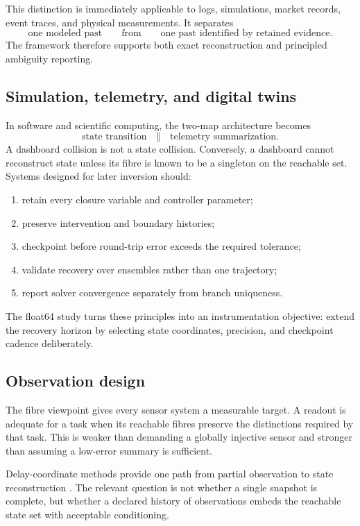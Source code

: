 This distinction is immediately applicable to logs, simulations, market records, event traces, and physical measurements. It separates
\[
\text{one modeled past}
\qquad\text{from}\qquad
\text{one past identified by retained evidence}.
\]
The framework therefore supports both exact reconstruction and principled ambiguity reporting.

\subsection{Simulation, telemetry, and digital twins}

In software and scientific computing, the two-map architecture becomes
\[
\text{state transition}
\quad\Vert\quad
\text{telemetry summarization}.
\]
A dashboard collision is not a state collision. Conversely, a dashboard cannot reconstruct state unless its fibre is known to be a singleton on the reachable set. Systems designed for later inversion should:
\begin{enumerate}
\item retain every closure variable and controller parameter;
\item preserve intervention and boundary histories;
\item checkpoint before round-trip error exceeds the required tolerance;
\item validate recovery over ensembles rather than one trajectory;
\item report solver convergence separately from branch uniqueness.
\end{enumerate}

The float64 study turns these principles into an instrumentation objective: extend the recovery horizon by selecting state coordinates, precision, and checkpoint cadence deliberately.

\subsection{Observation design}

The fibre viewpoint gives every sensor system a measurable target. A readout is adequate for a task when its reachable fibres preserve the distinctions required by that task. This is weaker than demanding a globally injective sensor and stronger than assuming a low-error summary is sufficient.

Delay-coordinate methods provide one path from partial observation to state reconstruction \citep{takens1981,sauer1991}. The relevant question is not whether a single snapshot is complete, but whether a declared history of observations embeds the reachable state set with acceptable conditioning.

